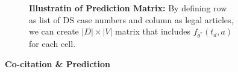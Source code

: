 \begin{figure}[!tbp]
\begin{subfigure}[b]{0.49\textwidth}
\begin{tikzpicture}
        \end{tikzpicture} 
        \label{fig:illutrate-preds}      
        \caption{\textbf{Illustratin of Prediction Matrix:} By defining row as list of DS case numbers and column as legal articles, we can create $|D| \times |V|$ matrix that includes $f_{\theta^*}(t_d, a)$ for each cell.}    
    \end{subfigure}
    \hfill
    \begin{subfigure}[b]{0.49\textwidth}
    \end{subfigure}
    \caption{{\bf Co-citation \& Prediction}}
    \label{fig:illutrate-preds}
  \end{figure}
  